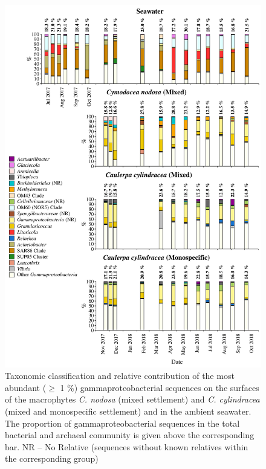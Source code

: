 \documentclass[12pt,]{article}
\begin{document}
\begin{figure}[H]

{\centering \includegraphics[width=0.85\linewidth]{../results/figures/gammaproteobacteria_bar_plot} 

}

\caption{Taxonomic classification and relative contribution of the most abundant ($\geq$ 1 \si{\percent}) gammaproteobacterial sequences on the surfaces of the macrophytes \textit{C. nodosa} (mixed settlement) and \textit{C. cylindracea} (mixed and monospecific settlement) and in the ambient seawater. The proportion of gammaproteobacterial sequences in the total bacterial and archaeal community is given above the corresponding bar. NR -- No Relative (sequences without known relatives within the corresponding group)\label{gamma}}\label{fig:unnamed-chunk-8}
\end{figure}
\end{document}
